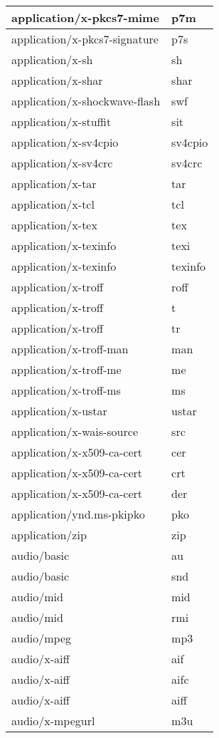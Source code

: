 \begin{longtable}{|p{200pt}|p{40pt}|}
\hline
application/x-pkcs7-mime	&p7m\\
\hline
application/x-pkcs7-signature	&p7s\\
\hline
application/x-sh	&sh\\
\hline
application/x-shar	&shar\\
\hline
application/x-shockwave-flash	&swf\\
\hline
application/x-stuffit	&sit\\
\hline
application/x-sv4cpio	&sv4cpio\\
\hline
application/x-sv4crc		&sv4crc\\
\hline
application/x-tar	&tar\\
\hline
application/x-tcl		&tcl\\
\hline
application/x-tex	&tex\\
\hline
application/x-texinfo	&texi\\
\hline
application/x-texinfo	&texinfo\\
\hline
application/x-troff	&roff\\
\hline
application/x-troff	&t\\
\hline
application/x-troff	&tr\\
\hline
application/x-troff-man	&man\\
\hline
application/x-troff-me	&me\\
\hline
application/x-troff-ms	&ms\\
\hline
application/x-ustar	&ustar\\
\hline
application/x-wais-source	&src\\
\hline
application/x-x509-ca-cert	&cer\\
\hline
application/x-x509-ca-cert	&crt\\
\hline
application/x-x509-ca-cert	&der\\
\hline
application/ynd.ms-pkipko	&pko\\
\hline
application/zip	&zip\\
\hline
audio/basic	&au\\
\hline
audio/basic	&snd\\
\hline
audio/mid	&mid\\
\hline
audio/mid	&rmi\\
\hline
audio/mpeg	&mp3\\
\hline
audio/x-aiff	&aif\\
\hline
audio/x-aiff	&aifc\\
\hline
audio/x-aiff	&aiff\\
\hline
audio/x-mpegurl 	&m3u\\
\hline

\end{longtable}
